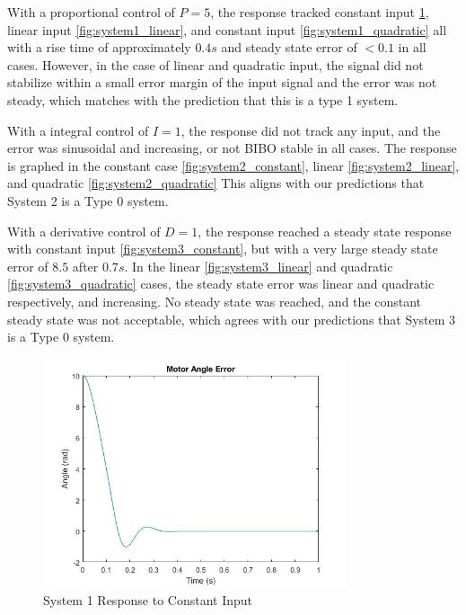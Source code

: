 With a proportional control of \(P = 5\), the response tracked constant input \ref{fig:system1_constant}, linear input \ref{fig:system1_linear}, and constant input \ref{fig:system1_quadratic} all with a rise time of approximately \(0.4 s\) and steady state error of \(< 0.1\) in all cases. However, in the case of linear and quadratic input, the signal did not stabilize within a small error margin of the input signal and the error was not steady, which matches with the prediction that this is a type 1 system.

With a integral control of \(I = 1\), the response did not track any input, and the error was sinusoidal and increasing, or not BIBO stable in all cases. The response is graphed in the constant case \ref{fig:system2_constant}, linear \ref{fig:system2_linear}, and quadratic \ref{fig:system2_quadratic} This aligns with our predictions that System 2 is a Type 0 system.

With a derivative control of \(D = 1\), the response reached a steady state response with constant input \ref{fig:system3_constant}, but with a very large steady state error of \(8.5\) after \(0.7 s\). In the linear \ref{fig:system3_linear} and quadratic \ref{fig:system3_quadratic} cases, the steady state error was linear and quadratic respectively, and increasing. No steady state was reached, and the constant steady state was not acceptable, which agrees with our predictions that System 3 is a Type 0 system.

\begin{figure}[H]
        \centering
        \includegraphics[width=0.8\textwidth]{./figures/lab4_fig7-part4-3-3-error-rc5.jpg}
        \caption{System 1 Response to Constant Input}
        \label{fig:system1_constant}
\end{figure}

